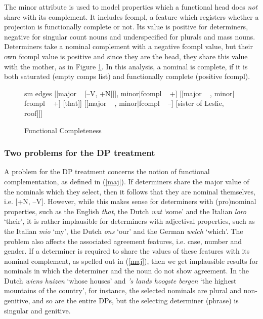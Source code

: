 \documentclass[output=paper]{langsci/langscibook}
\begin{document}
The {\sc minor} attribute is used to model properties which a functional head does {\em not} share with its 
complement. It includes {\sc fcompl}, a feature which registers whether a projection is 
functionally complete or not. Its value is positive for determiners, negative for  
singular count nouns and underspecified for plurals and mass nouns.  
Determiners take a nominal complement with a negative {\sc fcompl} value, but their 
own {\sc fcompl} value is positive and since they are the head, they share this value with 
the mother, as in Figure \ref{netter}. 
In this analysis, a nominal is complete, if it is both saturated 
(empty {\sc comps} list) and functionally complete (positive {\sc fcompl}). 

\begin{figure}
	\centering
	\begin{forest}
sm edges
[{[{\sc major} ~  [--V, +N[]], {\sc minor$|$fcompl} ~ +]}
		[{[{\sc major} ~ , {\sc minor$|$fcompl} ~ +]} [that]]
		[{[{\sc major} ~ , {\sc minor$|$fcompl} ~ --]} [sister of Leslie, roof]]]
	\end{forest}
	\caption{\label{netter} Functional Completeness }
\end{figure}


\subsubsection{Two problems for the DP treatment}  


A problem for the DP treatment concerns the notion of 
functional complementation, as defined in (\ref{maj}). 
If determiners share the {\sc major} value of the nominals which they select, 
then it follows that they are nominal themselves, i.e. [+N, --V].
However, while this makes sense for determiners with (pro)nominal properties,
such as the English \emph{that}, the Dutch \emph{wat} `some' and the Italian 
\emph{loro} `their', it is rather implausible for determiners with adjectival properties,
such as the Italian \emph{mio} `my', the Dutch \emph{ons} `our' and the German
\emph{welch} `which'.   
The problem also affects the associated agreement features, i.e. {\sc case}, 
{\sc number} and {\sc gender}. If a determiner 
is required to share the values of these features with its nominal complement,
as spelled out in (\ref{maj}), then we get implausible results for nominals in 
which the determiner and the noun do not show agreement.    
In the Dutch \emph{wiens huizen} `whose houses' and 
\emph{'s lands hoogste bergen} `the highest mountains of the country', for instance,  
the selected nominals are plural and non-genitive, and so are the entire DPs, but 
the selecting determiner (phrase) is singular and genitive. 
\end{document}
